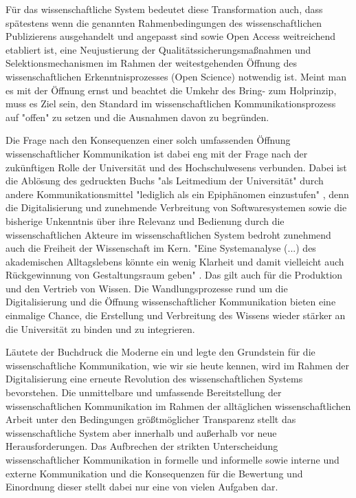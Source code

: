 Für das wissenschaftliche System bedeutet diese Transformation auch, dass spätestens wenn die genannten Rahmenbedingungen des wissenschaftlichen Publizierens ausgehandelt und angepasst sind sowie Open Access weitreichend etabliert ist, eine Neujustierung der Qualitätssicherungsmaßnahmen und Selektionsmechanismen im Rahmen der weitestgehenden Öffnung des wissenschaftlichen Erkenntnisprozesses (Open Science) notwendig ist. Meint man es mit der Öffnung ernst und beachtet die Umkehr des Bring- zum Holprinzip, muss es Ziel sein, den Standard im wissenschaftlichen Kommunikationsprozess auf "offen" zu setzen und die Ausnahmen davon zu begründen.

Die Frage nach den Konsequenzen einer solch umfassenden Öffnung wissenschaftlicher Kommunikation ist dabei eng mit der Frage nach der zukünftigen Rolle der Universität und des Hochschulwesens verbunden. Dabei ist die Ablösung des gedruckten Buchs "als Leitmedium der Universität" durch andere Kommunikationsmittel "lediglich als ein Epiphänomen einzustufen" \cite{Warnke_2012}, denn die Digitalisierung und zunehmende Verbreitung von Softwaresystemen sowie die bisherige Unkenntnis über ihre Relevanz und Bedienung durch die wissenschaftlichen Akteure im wissenschaftlichen System bedroht zunehmend auch die Freiheit der Wissenschaft im Kern. "Eine Systemanalyse (...) des akademischen Alltagslebens könnte ein wenig Klarheit und damit vielleicht auch Rückgewinnung von Gestaltungsraum geben" \cite{Warnke_2012}. Das gilt auch für die Produktion und den Vertrieb von Wissen. Die Wandlungsprozesse rund um die Digitalisierung und die Öffnung wissenschaftlicher Kommunikation bieten eine einmalige Chance, die Erstellung und Verbreitung des Wissens wieder stärker an die Universität zu binden und zu integrieren.

Läutete der Buchdruck die Moderne ein und legte den Grundstein für die wissenschaftliche Kommunikation, wie wir sie heute kennen, wird im Rahmen der Digitalisierung eine erneute Revolution des wissenschaftlichen Systems bevorstehen. Die unmittelbare und umfassende Bereitstellung der wissenschaftlichen Kommunikation im Rahmen der alltäglichen wissenschaftlichen Arbeit unter den Bedingungen größtmöglicher Transparenz stellt das wissenschaftliche System aber innerhalb und außerhalb vor neue Herausforderungen. Das Aufbrechen der strikten Unterscheidung wissenschaftlicher Kommunikation in formelle und informelle sowie interne und externe Kommunikation und die Konsequenzen für die Bewertung und Einordnung dieser stellt dabei nur eine von vielen Aufgaben dar.

